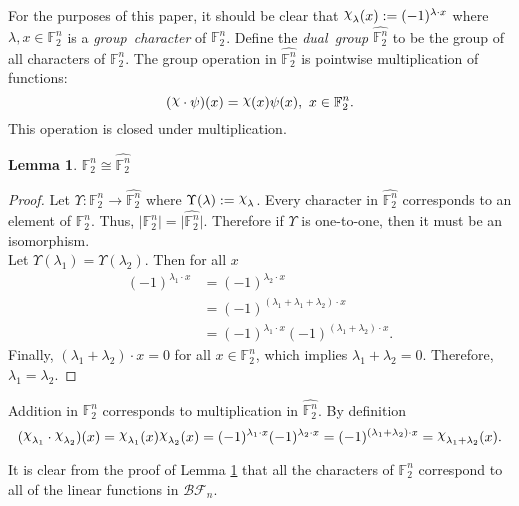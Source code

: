 \documentclass[english]{article}
\def\gftwo{\mathbb{F}_2}
\def\BF{\mathcal{BF}}
\def\Chi{\raisebox{2pt}{$\chi$}}
\theoremstyle{plain}
\newtheorem{lemma}[theorem]{Lemma}%
\theoremstyle{definition}
\theoremstyle{remark}
\begin{document}
For the purposes of this paper, it should be clear that
$\Chi_\lambda(x):=(-1)^{\lambda\cdot x}$ where $\lambda,x\in\gftwo^n$ is a
{\em group\ character} of $\gftwo^n$. Define the {\em dual\ group}
$\hat{\gftwo^n}$ to be the group of all characters of $\gftwo^n$. The group
operation
in $\hat{\gftwo^n}$ is pointwise multiplication of functions:
\[
(\Chi\cdot\psi)(x)=\Chi(x)\psi(x),\ x\in\gftwo^n.
\]
This operation is closed under multiplication.

\begin{lemma}\label{lem:dual}
  $\gftwo^n\cong\hat{\gftwo^n}$
\end{lemma}

\begin{proof}
  \par Let $\Upsilon:\gftwo^n\rightarrow\hat{\gftwo^n}$ where
  $\Upsilon(\lambda):=\Chi_\lambda$.
  Every character in $\hat{\gftwo^n}$ corresponds to an element of
  $\gftwo^n$. Thus, $\lvert\gftwo^n\rvert=\lvert\hat{\gftwo^n}\rvert$.
  Therefore if $\Upsilon$ is one-to-one, then it must be an isomorphism.\\
  Let $\Upsilon(\lambda_1)=\Upsilon(\lambda_2)$. Then for all $x$
  \begin{align*}
    (-1)^{\lambda_1\cdot x}
      &=(-1)^{\lambda_2\cdot x}\\
      &=(-1)^{(\lambda_1+\lambda_1+\lambda_2)\cdot x}\\
      &=(-1)^{\lambda_1\cdot x}(-1)^{(\lambda_1+\lambda_2)\cdot x}.
  \end{align*}
  Finally, $(\lambda_1+\lambda_2)\cdot x=0$ for all $x\in\gftwo^n$, which
  implies $\lambda_1+\lambda_2=0$. Therefore, $\lambda_1=\lambda_2$.
\end{proof}

\par Addition in $\gftwo^n$ corresponds to multiplication in
$\hat{\gftwo^n}$. By definition
\[
(\Chi_{\lambda_1}\cdot\Chi_{\lambda_2})(x)
  =\Chi_{\lambda_1}(x)\Chi_{\lambda_2}(x)
  =(-1)^{\lambda_1\cdot x}(-1)^{\lambda_2\cdot x}
  =(-1)^{(\lambda_1+\lambda_2)\cdot x}
  =\Chi_{\lambda_1+\lambda_2}(x).
\]

\par It is clear from the proof of Lemma \ref{lem:dual} that all the characters
of $\gftwo^n$ correspond to all of the linear functions in $\BF_n$.
\end{document}
